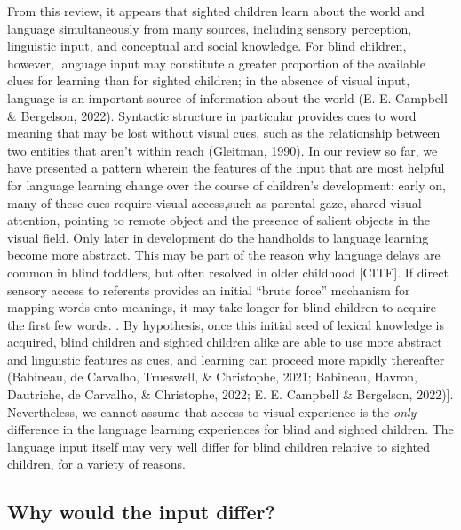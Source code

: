 \documentclass[
  man,floatsintext]{apa6}
\begin{document}
From this review, it appears that sighted children learn about the world and language simultaneously from many sources, including sensory perception, linguistic input, and conceptual and social knowledge. For blind children, however, language input may constitute a greater proportion of the available clues for learning than for sighted children; in the absence of visual input, language is an important source of information about the world (E. E. Campbell \& Bergelson, 2022). Syntactic structure in particular provides cues to word meaning that may be lost without visual cues, such as the relationship between two entities that aren't within reach (Gleitman, 1990). In our review so far, we have presented a pattern wherein the features of the input that are most helpful for language learning change over the course of children's development: early on, many of these cues require visual access,such as parental gaze, shared visual attention, pointing to remote object and the presence of salient objects in the visual field. Only later in development do the handholds to language learning become more abstract. This may be part of the reason why language delays are common in blind toddlers, but often resolved in older childhood {[}CITE{]}. If direct sensory access to referents provides an initial ``brute force'' mechanism for mapping words onto meanings, it may take longer for blind children to acquire the first few words. . By hypothesis, once this initial seed of lexical knowledge is acquired, blind children and sighted children alike are able to use more abstract and linguistic features as cues, and learning can proceed more rapidly thereafter (Babineau, de Carvalho, Trueswell, \& Christophe, 2021; Babineau, Havron, Dautriche, de Carvalho, \& Christophe, 2022; E. E. Campbell \& Bergelson, 2022){]}. Nevertheless, we cannot assume that access to visual experience is the \emph{only} difference in the language learning experiences for blind and sighted children. The language input itself may very well differ for blind children relative to sighted children, for a variety of reasons.

\hypertarget{why-would-the-input-differ}{%
\subsection{Why would the input differ?}\label{why-would-the-input-differ}}
\end{document}

